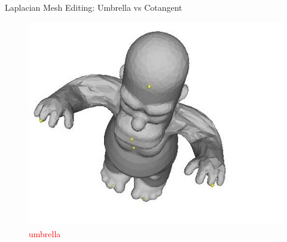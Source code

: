 \documentclass{beamer}
\begin{document}
\begin{frame}{Laplacian Mesh Editing: Umbrella vs Cotangent}

\begin{figure}
\begin{minipage}{0.45\textwidth}
    \includegraphics[width=\textwidth]{homer_umbrella.jpg}
    \caption{\textcolor{red}{umbrella}}
\end{minipage}
\end{figure}

\end{frame}
\end{document}
